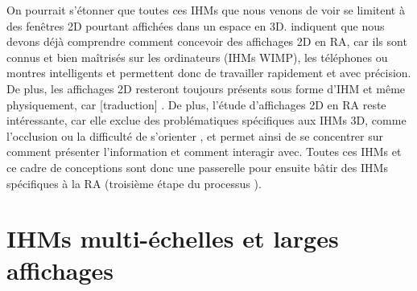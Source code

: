 
On pourrait s'étonner que toutes ces IHMs que nous venons de voir se limitent à des fenêtres 2D pourtant affichées dans un espace en 3D. \cite{Ens2014a} indiquent que nous devons déjà comprendre comment concevoir des affichages 2D en RA, car ils sont connus et bien maîtrisés sur les ordinateurs (IHMs WIMP), les téléphones ou montres intelligents et permettent donc de travailler rapidement et avec précision. De plus, les affichages 2D resteront toujours présents sous forme d'IHM et même physiquement, car [traduction]  \citep[p. 1]{Ens2014a}. De plus, l'étude d'affichages 2D en RA reste intéressante, car elle exclue des problématiques spécifiques aux IHMs 3D, comme l'occlusion ou la difficulté de s'orienter \citep{Berge2014}, et permet ainsi de se concentrer sur comment présenter l'information et comment interagir avec. Toutes ces IHMs et ce cadre de conceptions sont donc une passerelle pour ensuite bâtir des IHMs spécifiques à la RA (troisième étape du processus \cite{Billinghurst2005}).


\section{IHMs multi-échelles et larges affichages}
\label{sec:litterature_multiscale_displays}


